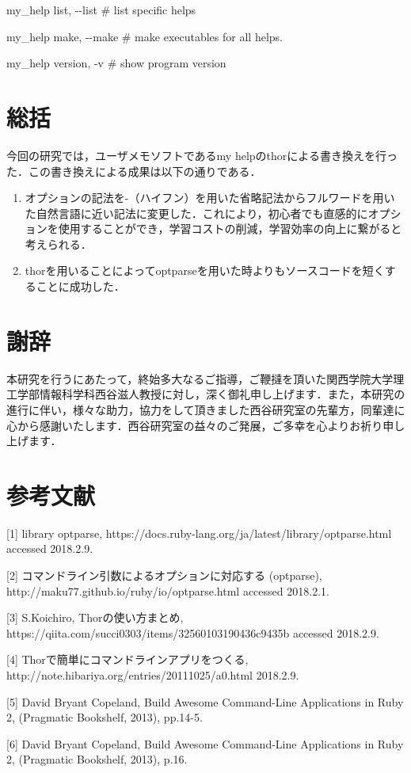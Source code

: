 my\_help list, -\/-list \# list specific helps

my\_help make, -\/-make \# make executables for all helps.

my\_help version, -v \# show program version

    \section{総括}\label{ux7dcfux62ec}

今回の研究では，ユーザメモソフトであるmy
helpのthorによる書き換えを行った．この書き換えによる成果は以下の通りである．

\begin{enumerate}
\def\labelenumi{\arabic{enumi}.}
\item
  オプションの記法を-（ハイフン）を用いた省略記法からフルワードを用いた自然言語に近い記法に変更した．これにより，初心者でも直感的にオプションを使用することができ，学習コストの削減，学習効率の向上に繋がると考えられる．
\item
  thorを用いることによってoptparseを用いた時よりもソースコードを短くすることに成功した．
\end{enumerate}

    \section{謝辞}\label{ux8b1dux8f9e}

本研究を行うにあたって，終始多大なるご指導，ご鞭撻を頂いた関西学院大学理工学部情報科学科西谷滋人教授に対し，深く御礼申し上げます．また，本研究の進行に伴い，様々な助力，協力をして頂きました西谷研究室の先輩方，同輩達に心から感謝いたします．西谷研究室の益々のご発展，ご多幸を心よりお祈り申し上げます．

    \section{参考文献}\label{ux53c2ux8003ux6587ux732e}

{[}1{]} library optparse,
https://docs.ruby-lang.org/ja/latest/library/optparse.html accessed
2018.2.9.

{[}2{]} コマンドライン引数によるオプションに対応する (optparse),
http://maku77.github.io/ruby/io/optparse.html accessed 2018.2.1.

{[}3{]} S.Koichiro, Thorの使い方まとめ,
https://qiita.com/succi0303/items/32560103190436c9435b accessed
2018.2.9.

{[}4{]} Thorで簡単にコマンドラインアプリをつくる,
http://note.hibariya.org/entries/20111025/a0.html 2018.2.9.

{[}5{]} David Bryant Copeland, Build Awesome Command-Line Applications
in Ruby 2, (Pragmatic Bookshelf, 2013), pp.14-5.

{[}6{]} David Bryant Copeland, Build Awesome Command-Line Applications
in Ruby 2, (Pragmatic Bookshelf, 2013), p.16.


    
    
    
    
